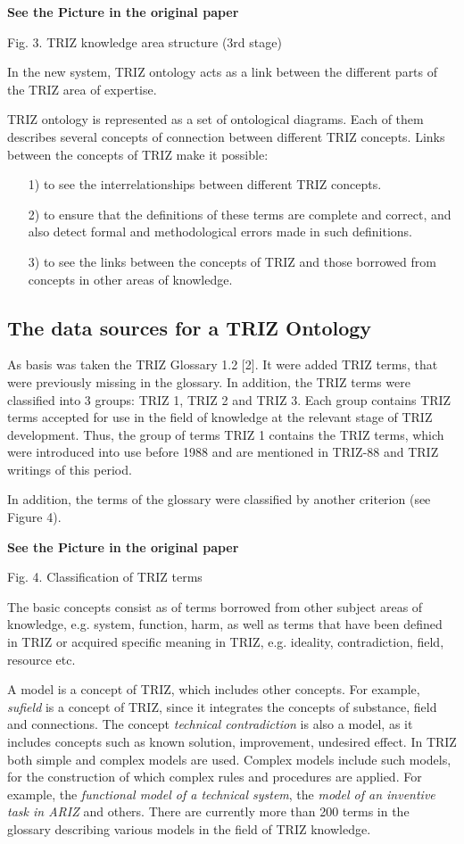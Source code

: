 \documentclass[11pt,a4paper]{article}
\newcommand{\addpicture}{\textbf{See the Picture in the original paper}\par}
\begin{document}
\begin{center}
  \addpicture
  Fig. 3. TRIZ knowledge area structure (3rd stage)
\end{center}

In the new system, TRIZ ontology acts as a link between the different parts of
the TRIZ area of expertise.

TRIZ ontology is represented as a set of ontological diagrams. Each of them
describes several concepts of connection between different TRIZ concepts.
Links between the concepts of TRIZ make it possible:
\begin{itemize}
\item[1)] to see the interrelationships between different TRIZ concepts.
\item[2)] to ensure that the definitions of these terms are complete and
  correct, and also detect formal and methodological errors made in such
  definitions.
\item[3)] to see the links between the concepts of TRIZ and those borrowed
  from concepts in other areas of knowledge.
\end{itemize}

\subsection{The data sources for a TRIZ Ontology}

As basis was taken the TRIZ Glossary 1.2 [2]. It were added TRIZ terms, that
were previously missing in the glossary. In addition, the TRIZ terms were
classified into 3 groups: TRIZ 1, TRIZ 2 and TRIZ 3. Each group contains TRIZ
terms accepted for use in the field of knowledge at the relevant stage of TRIZ
development. Thus, the group of terms TRIZ 1 contains the TRIZ terms, which
were introduced into use before 1988 and are mentioned in TRIZ-88 and TRIZ
writings of this period.

In addition, the terms of the glossary were classified by another criterion
(see Figure 4).

\begin{center}
  \addpicture
  Fig. 4. Classification of TRIZ terms
\end{center}

The basic concepts consist as of terms borrowed from other subject areas of
knowledge, e.g. system, function, harm, as well as terms that have been
defined in TRIZ or acquired specific meaning in TRIZ, e.g. ideality,
contradiction, field, resource etc.

A model is a concept of TRIZ, which includes other concepts. For example,
\emph{sufield} is a concept of TRIZ, since it integrates the concepts of
substance, field and connections.  The concept \emph{technical contradiction}
is also a model, as it includes concepts such as known solution, improvement,
undesired effect. In TRIZ both simple and complex models are used. Complex
models include such models, for the construction of which complex rules and
procedures are applied.  For example, the \emph{functional model of a
  technical system}, the \emph{model of an inventive task in ARIZ} and others.
There are currently more than 200 terms in the glossary describing various
models in the field of TRIZ knowledge.
\end{document}
